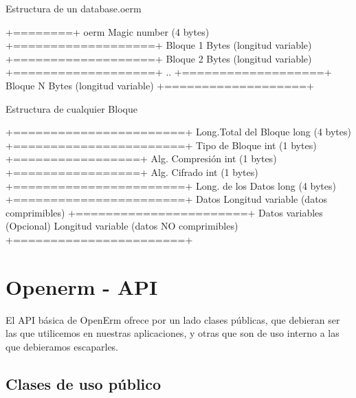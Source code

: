 \documentclass[a4paper,12pt,spanish]{sphinxmanual}
\begin{document}
\begin{sphinxVerbatim}[commandchars=\\\{\}]
Estructura de un \PYGZlt{}database\PYGZgt{}.oerm

+========+
\textbar{} \PYGZdq{}oerm\PYGZdq{} \textbar{}              \PYGZhy{}\PYGZhy{}\PYGZgt{} \PYGZdq{}Magic number\PYGZdq{} (4 bytes)
+===================+
\textbar{}     Bloque 1      \textbar{}   \PYGZhy{}\PYGZhy{}\PYGZgt{} Bytes (longitud variable)
+===================+
\textbar{}                   \textbar{}
\textbar{}     Bloque 2      \textbar{}   \PYGZhy{}\PYGZhy{}\PYGZgt{} Bytes (longitud variable)
\textbar{}                   \textbar{}
+===================+
..
+===================+
\textbar{}     Bloque  N     \textbar{}   \PYGZhy{}\PYGZhy{}\PYGZgt{} Bytes (longitud variable)
+===================+


Estructura de cualquier Bloque

+=======================+
\textbar{} Long.Total del Bloque \textbar{}   \PYGZhy{}\PYGZhy{}\PYGZgt{} long (4 bytes)
+=======================+
\textbar{} Tipo de Bloque  \textbar{}         \PYGZhy{}\PYGZhy{}\PYGZgt{} int (1 bytes)
+=================+
\textbar{} Alg. Compresión \textbar{}         \PYGZhy{}\PYGZhy{}\PYGZgt{} int (1 bytes)
+=================+
\textbar{} Alg. Cifrado    \textbar{}         \PYGZhy{}\PYGZhy{}\PYGZgt{} int (1 bytes)
+=======================+
\textbar{} Long. de los Datos    \textbar{}   \PYGZhy{}\PYGZhy{}\PYGZgt{} long (4 bytes)
+=======================+
\textbar{}                       \textbar{}
\textbar{}        Datos          \textbar{}   \PYGZhy{}\PYGZhy{}\PYGZgt{} Longitud variable (datos comprimibles)
\textbar{}                       \textbar{}
+=======================+
\textbar{}                       \textbar{}
\textbar{}    Datos variables    \textbar{}   \PYGZhy{}\PYGZhy{}\PYGZgt{} (Opcional) Longitud variable (datos NO comprimibles)
\textbar{}                       \textbar{}
+=======================+
\end{sphinxVerbatim}


\section{Openerm - API}
\label{\detokenize{openerm:openerm-api}}\label{\detokenize{openerm::doc}}
El API básica de OpenErm ofrece por un lado clases públicas, que debieran ser
las que utilicemos en nuestras aplicaciones, y otras que son de uso interno a las
que debieramos escaparles.


\subsection{Clases de uso público}
\label{\detokenize{openerm:clases-de-uso-publico}}\label{\detokenize{openerm.OermClient:oermclient}}\label{\detokenize{openerm.OermClient:module-openerm.OermClient}}\label{\detokenize{openerm.OermClient:oermclient}}
\end{document}

